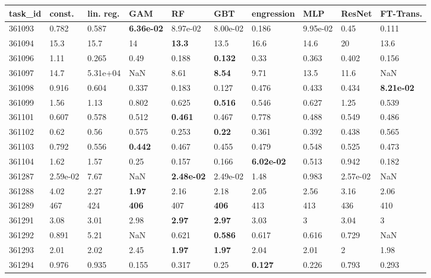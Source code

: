 \begin{table}[ht!]
\centering
\begingroup\footnotesize
\begin{tabular}{llllllllll}
  \hline
\hline
task\_id & const. & lin. reg. & GAM & RF & GBT & engression & MLP & ResNet & FT-Trans. \\ 
  \hline
361093 & 0.782 & 0.587 & \textbf{6.36e-02} & 8.97e-02 & 8.00e-02 & 0.186 & 9.95e-02 & 0.45 & 0.111 \\ 
  361094 & 15.3 & 15.7 & 14 & \textbf{13.3} & 13.5 & 16.6 & 14.6 & 20 & 13.6 \\ 
  361096 & 1.11 & 0.265 & 0.49 & 0.188 & \textbf{0.132} & 0.33 & 0.363 & 0.402 & 0.156 \\ 
  361097 & 14.7 & 5.31e+04 & NaN & 8.61 & \textbf{8.54} & 9.71 & 13.5 & 11.6 & NaN \\ 
  361098 & 0.916 & 0.604 & 0.337 & 0.183 & 0.127 & 0.476 & 0.433 & 0.434 & \textbf{8.21e-02} \\ 
  361099 & 1.56 & 1.13 & 0.802 & 0.625 & \textbf{0.516} & 0.546 & 0.627 & 1.25 & 0.539 \\ 
  361101 & 0.607 & 0.578 & 0.512 & \textbf{0.461} & 0.467 & 0.778 & 0.488 & 0.549 & 0.486 \\ 
  361102 & 0.62 & 0.56 & 0.575 & 0.253 & \textbf{0.22} & 0.361 & 0.392 & 0.438 & 0.565 \\ 
  361103 & 0.792 & 0.556 & \textbf{0.442} & 0.467 & 0.455 & 0.479 & 0.548 & 0.525 & 0.473 \\ 
  361104 & 1.62 & 1.57 & 0.25 & 0.157 & 0.166 & \textbf{6.02e-02} & 0.513 & 0.942 & 0.182 \\ 
  361287 & 2.59e-02 & 7.67 & NaN & \textbf{2.48e-02} & 2.49e-02 & 1.48 & 0.983 & 2.57e-02 & NaN \\ 
  361288 & 4.02 & 2.27 & \textbf{1.97} & 2.16 & 2.18 & 2.05 & 2.56 & 3.16 & 2.06 \\ 
  361289 & 467 & 424 & \textbf{406} & 407 & \textbf{406} & 413 & 413 & 436 & 410 \\ 
  361291 & 3.08 & 3.01 & 2.98 & \textbf{2.97} & \textbf{2.97} & 3.03 & 3 & 3.04 & 3 \\ 
  361292 & 0.891 & 5.21 & NaN & 0.621 & \textbf{0.586} & 0.617 & 0.616 & 0.729 & NaN \\ 
  361293 & 2.01 & 2.02 & 2.45 & \textbf{1.97} & \textbf{1.97} & 2.04 & 2.01 & 2 & 1.98 \\ 
  361294 & 0.976 & 0.935 & 0.155 & 0.317 & 0.25 & \textbf{0.127} & 0.226 & 0.793 & 0.293 \\ 

\end{tabular}
\end{table}
